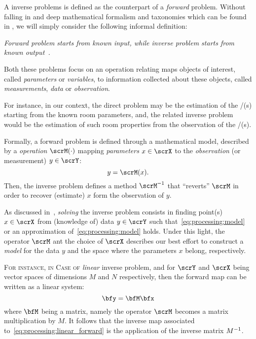 A inverse problems is defined as the counterpart of a \textit{forward} problem.
Without falling in and deep mathematical formalism and taxonomies which can be found in ,
we will simply consider the following informal definition:
\begin{center}
    \textit{\emph{Forward problem} starts from known input, while \emph{inverse problem} starts from known output~\cite{santamarina2005discrete}.}
\end{center}
Both these problems focus on an operation relating maps objects of interest, called \textit{parameters} or \textit{variables},
to information collected about these objects, called \textit{measurements}, \textit{data} or \textit{observation}.

For instance, in our context, the direct problem may be the estimation of the \RIR/(s) starting from the known room parameters,
and, the related inverse problem would be the estimation of such room properties from the observation of the \RIR/(s).

Formally, a forward problem is defined through a mathematical model, described by a \textit{operation} $\scrM(\cdot)$
mapping \textit{parameters} $x \in \scrX$ to the \textit{observation} (or measurement) $y \in \scrY$:
\begin{equation}\label{eq:processing:model}
    y = \scrM(x)
    .
\end{equation}
Then, the inverse problem defines a method $\kinv{\scrM}$ that ``reverts'' $\scrM$ in order to recover (estimate) $x$ form the observation of $y$.

As discussed in~\cite{bal2012introduction}, \textit{solving} the inverse problem consists in finding point(s) $x \in \scrX$ from (knowledge of) data $y \in \scrY$
such that~\cref{eq:processing:model} or an approximation of~\cref{eq:processing:model} holds.
Under this light, the operator $\scrM$ ant the choice of $\scrX$ describes our best effort to construct a \textit{model} for the data $y$ and
the space where the parameters $x$ belong, respectively.

\textsc{For instance, in Case of} \textit{linear} inverse problem, and for $\scrY$ and $\scrX$ being vector spaces of dimensions $M$ and $N$ respectively,
then the forward map can be written as a linear system:
\begin{equation}\label{eq:processing:linear_forward}
    \bfy = \bfM \bfx
\end{equation}
where $\bfM$ being a matrix, namely the operator $\scrM$ becomes a matrix multiplication by $M$.
It follows that the inverse map associated to~\cref{eq:processing:linear_forward} is the application of the inverse matrix ${M}^{-1}$.

